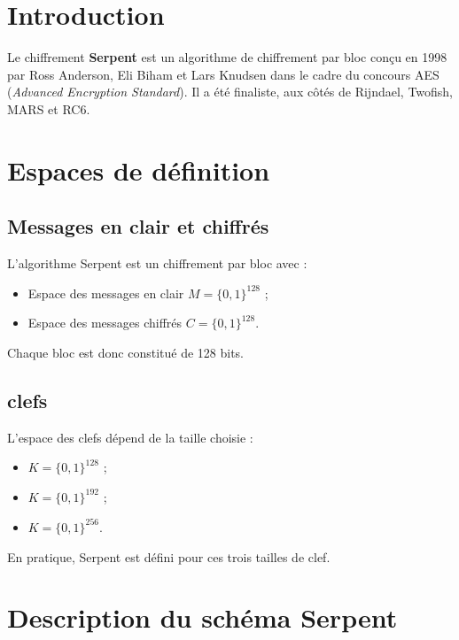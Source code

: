 \documentclass[12pt,a4paper]{report}
\begin{document}
\tableofcontents










\section*{Introduction}

Le chiffrement \textbf{Serpent} est un algorithme de chiffrement par bloc
conçu en 1998 par Ross Anderson, Eli Biham et Lars Knudsen dans le cadre du concours AES
(\textit{Advanced Encryption Standard}). Il a été finaliste, aux côtés de Rijndael, Twofish, MARS et RC6.

\section*{Espaces de définition}

\subsection{Messages en clair et chiffrés}
L’algorithme Serpent est un chiffrement par bloc avec :
\begin{itemize}
    \item Espace des messages en clair $M = \{0,1\}^{128}$ ;
    \item Espace des messages chiffrés $C = \{0,1\}^{128}$.
\end{itemize}
Chaque bloc est donc constitué de 128 bits.

\subsection{clefs}
L’espace des clefs dépend de la taille choisie :
\begin{itemize}
    \item $K = \{0,1\}^{128}$ ;
    \item $K = \{0,1\}^{192}$ ;
    \item $K = \{0,1\}^{256}$.
\end{itemize}
En pratique, Serpent est défini pour ces trois tailles de clef.










\section*{Description du schéma Serpent}
\end{document}
